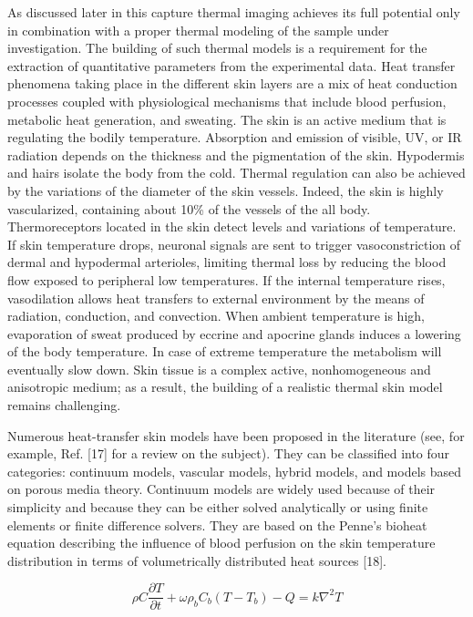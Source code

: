 As discussed later in this capture thermal imaging achieves its full potential only
in combination with a proper thermal modeling of the sample under investigation. The
building of such thermal models is a requirement for the extraction of quantitative
parameters from the experimental data. Heat transfer phenomena taking place in the
different skin layers are a mix of heat conduction processes coupled with
physiological mechanisms that include blood perfusion, metabolic heat generation,
and sweating. The skin is an active medium that is regulating the bodily temperature.
Absorption and emission of visible, UV, or IR radiation depends on the thickness and
the pigmentation of the skin. Hypodermis and hairs isolate the body from the cold.
Thermal regulation can also be achieved by the variations of the diameter of the skin
vessels. Indeed, the skin is highly vascularized, containing about 10\% of the vessels
of the all body. Thermoreceptors located in the skin detect levels and variations
of temperature. If skin temperature drops, neuronal signals are sent to trigger
vasoconstriction of dermal and hypodermal arterioles, limiting thermal loss by
reducing the blood flow exposed to peripheral low temperatures. If the internal
temperature rises, vasodilation allows heat transfers to external environment by
the means of radiation, conduction, and convection. When ambient temperature is high,
evaporation of sweat produced by eccrine and apocrine glands induces a lowering of the
body temperature. In case of extreme temperature the metabolism will eventually slow
down. Skin tissue is a complex active, nonhomogeneous and anisotropic medium; as a
result, the building of a realistic thermal skin model remains challenging.

Numerous heat-transfer skin models have been proposed in the literature (see, for
example, Ref. [17] for a review on the subject). They can be classified into four
categories: continuum models, vascular models, hybrid models, and models based on
porous media theory. Continuum models are widely used because of their simplicity
and because they can be either solved analytically or using finite elements or
finite difference solvers. They are based on the Penne's bioheat equation describing
the influence of blood perfusion on the skin temperature distribution in terms of
volumetrically distributed heat sources [18].

\begin{equation} 
	\rho C \frac{\partial T}{\partial t} + \omega \rho_b C_b \left ( T - T_b \right ) - Q = k \nabla^2 T
\end{equation}

